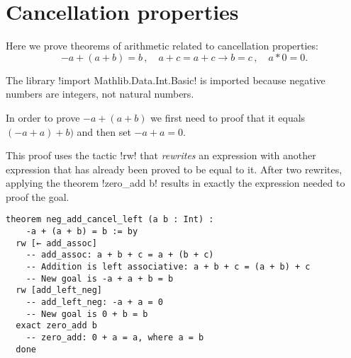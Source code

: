 
\section{Cancellation properties}

Here we prove theorems of arithmetic related to cancellation properties:
\[
-a+(a+b) =b\,,\quad a+c=a+c \rightarrow b= c\,,\quad a*0 =0.
\]

The library !import Mathlib.Data.Int.Basic! is imported because negative numbers are integers, not natural numbers.


In order to prove $- a + (a + b)$ we first need to proof that it equals $(-a + a) + b)$ and then set $-a + a = 0$.

This proof uses the tactic !rw! that \emph{rewrites} an expression with another expression that has already been proved to be equal to it. After two rewrites, applying the theorem !zero_add b! results in exactly the expression needed to proof the goal.

\begin{Verbatim}
theorem neg_add_cancel_left (a b : Int) :
    -a + (a + b) = b := by
  rw [← add_assoc]
    -- add_assoc: a + b + c = a + (b + c)
    -- Addition is left associative: a + b + c = (a + b) + c
    -- New goal is -a + a + b = b
  rw [add_left_neg]
    -- add_left_neg: -a + a = 0
    -- New goal is 0 + b = b
  exact zero_add b
    -- zero_add: 0 + a = a, where a = b
  done
\end{Verbatim}


